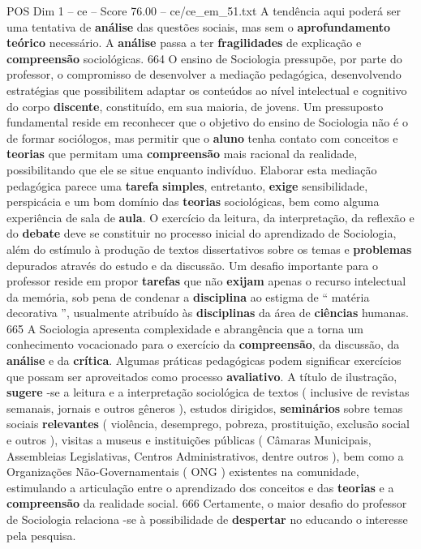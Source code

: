 \begin{textsample}{POS Dim 1 – ce – Score 76.00 – ce/ce\_em\_51.txt}
A tendência aqui poderá ser uma tentativa de \textbf{análise} das questões sociais, mas sem o \textbf{aprofundamento} \textbf{teórico} necessário.
A \textbf{análise} passa a ter \textbf{fragilidades} de explicação e \textbf{compreensão} sociológicas. 664 O ensino de Sociologia pressupõe, por parte do professor, o compromisso de desenvolver a mediação pedagógica, desenvolvendo estratégias que possibilitem adaptar os conteúdos ao nível intelectual e cognitivo do corpo \textbf{discente}, constituído, em sua maioria, de jovens.
Um pressuposto fundamental reside em reconhecer que o objetivo do ensino de Sociologia não é o de formar sociólogos, mas permitir que o \textbf{aluno} tenha contato com conceitos e \textbf{teorias} que permitam uma \textbf{compreensão} mais racional da realidade, possibilitando que ele se situe enquanto indivíduo.
Elaborar esta mediação pedagógica parece uma \textbf{tarefa} \textbf{simples}, entretanto, \textbf{exige} sensibilidade, perspicácia e um bom domínio das \textbf{teorias} sociológicas, bem como alguma experiência de sala de \textbf{aula}.
O exercício da leitura, da interpretação, da reflexão e do \textbf{debate} deve se constituir no processo inicial do aprendizado de Sociologia, além do estímulo à produção de textos dissertativos sobre os temas e \textbf{problemas} depurados através do estudo e da discussão.
Um desafio importante para o professor reside em propor \textbf{tarefas} que não \textbf{exijam} apenas o recurso intelectual da memória, sob pena de condenar a \textbf{disciplina} ao estigma de “ matéria decorativa ”, usualmente atribuído às \textbf{disciplinas} da área de \textbf{ciências} humanas. 665 A Sociologia apresenta complexidade e abrangência que a torna um conhecimento vocacionado para o exercício da \textbf{compreensão}, da discussão, da \textbf{análise} e da \textbf{crítica}.
Algumas práticas pedagógicas podem significar exercícios que possam ser aproveitados como processo \textbf{avaliativo}.
A título de ilustração, \textbf{sugere} -se a leitura e a interpretação sociológica de textos ( inclusive de revistas semanais, jornais e outros gêneros ), estudos dirigidos, \textbf{seminários} sobre temas sociais \textbf{relevantes} ( violência, desemprego, pobreza, prostituição, exclusão social e outros ), visitas a museus e instituições públicas ( Câmaras Municipais, Assembleias Legislativas, Centros Administrativos, dentre outros ), bem como a Organizações Não-Governamentais ( ONG ) existentes na comunidade, estimulando a articulação entre o aprendizado dos conceitos e das \textbf{teorias} e a \textbf{compreensão} da realidade social. 666 Certamente, o maior desafio do professor de Sociologia relaciona -se à possibilidade de \textbf{despertar} no educando o interesse pela pesquisa.

\end{textsample}
